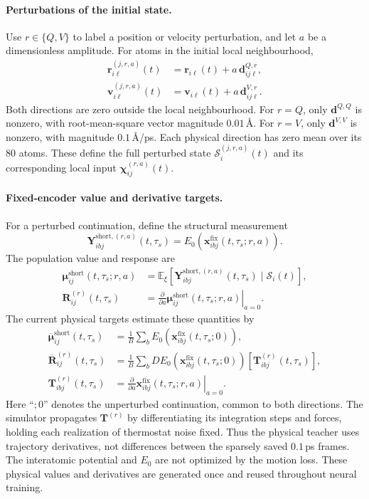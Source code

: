 \documentclass[11pt,a4paper]{article}
\newcommand{\E}{\mathbb E}
\newcommand{\x}{\mathbf x}
\begin{document}
\paragraph{Perturbations of the initial state.}
Use $r\in\{Q,V\}$ to label a position or velocity perturbation, and let $a$ be
a dimensionless amplitude. For atoms in the initial local neighbourhood,
\[
\begin{aligned}
\mathbf r_{i\ell}^{(j,r,a)}(t)
 &=\mathbf r_{i\ell}(t)+a\,\mathbf d^{Q,r}_{ij\ell},\\
\mathbf v_{i\ell}^{(j,r,a)}(t)
 &=\mathbf v_{i\ell}(t)+a\,\mathbf d^{V,r}_{ij\ell}.
\end{aligned}
\]
Both directions are zero outside the local neighbourhood. For $r=Q$, only
$\mathbf d^{Q,Q}$ is nonzero, with root-mean-square vector magnitude
$0.01$\,\AA. For $r=V$, only $\mathbf d^{V,V}$ is nonzero, with magnitude
$0.1$\,\AA/ps. Each physical direction has zero mean over its 80 atoms.
These define the full perturbed state $\mathcal S_i^{(j,r,a)}(t)$ and its
corresponding local input $\boldsymbol\chi_{ij}^{(r,a)}(t)$.

\paragraph{Fixed-encoder value and derivative targets.}
For a perturbed continuation, define the structural measurement
\[
\mathbf Y^{\mathrm{short},(r,a)}_{ibj}(t,\tau_s)
=E_0\!\left(\x_{ibj}^{\mathrm{fix}}(t,\tau_s;r,a)\right).
\]
The population value and response are
\[
\begin{aligned}
\boldsymbol\mu^{\mathrm{short}}_{ij}(t,\tau_s;r,a)
 &=\E_{\xi}\!\left[
 \mathbf Y^{\mathrm{short},(r,a)}_{ibj}(t,\tau_s)\mid\mathcal S_i(t)\right],\\
\mathbf R^{(r)}_{ij}(t,\tau_s)
 &=\left.\frac{\partial}{\partial a}
 \boldsymbol\mu^{\mathrm{short}}_{ij}(t,\tau_s;r,a)\right|_{a=0}.
\end{aligned}
\]
The current physical targets estimate these quantities by
\begin{align}
\overline{\boldsymbol\mu}^{\mathrm{short}}_{ij}(t,\tau_s)
 &=\frac1B\sum_b E_0\!\left(\x_{ibj}^{\mathrm{fix}}(t,\tau_s;0)\right),
\label{eq:teacher-value}\\
\overline{\mathbf R}^{(r)}_{ij}(t,\tau_s)
 &=\frac1B\sum_b
D E_0\!\left(\x_{ibj}^{\mathrm{fix}}(t,\tau_s;0)\right)
 \left[\mathbf T^{(r)}_{ibj}(t,\tau_s)\right],
\label{eq:teacher-response}\\
\mathbf T^{(r)}_{ibj}(t,\tau_s)
 &=\left.\frac{\partial}{\partial a}
 \x_{ibj}^{\mathrm{fix}}(t,\tau_s;r,a)\right|_{a=0}.
\nonumber
\end{align}
Here ``$;0$'' denotes the unperturbed continuation, common to both directions.
The simulator propagates $\mathbf T^{(r)}$ by differentiating its integration
steps and forces, holding each realization of thermostat noise fixed.
Thus the physical teacher uses trajectory derivatives, not differences between
the sparsely saved $0.1$\,ps frames. The interatomic potential and $E_0$ are not
optimized by the motion loss. These physical values and derivatives are generated
once and reused throughout neural training.
\end{document}
